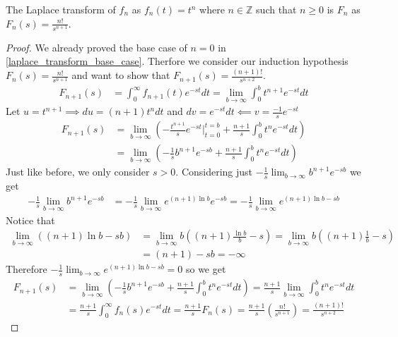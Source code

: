 \documentclass[notes]{subfiles}
\begin{document}
\begin{lemma}
    The Laplace transform of $f_n$ as $f_n(t) = t^n$ where $n \in \mathbb{Z}$ such that $n \geq 0$ is $F_n$ as $F_n(s) = \frac{n!}{s^{n + 1}}$.
\end{lemma}
\begin{proof}
    We already proved the base case of $n = 0$ in \cref{laplace_transform_base_case}. Therfore we consider our induction hypothesis $F_n(s) = \frac{n!}{s^{n + 1}}$   and want to show that $F_{n + 1}(s) = \frac{(n + 1)!}{s^{n + 2}}$.
    \begin{align*}
        F_{n + 1}(s)
        &= \int_0^\infty f_{n + 1}(t)e^{-st}dt
        = \lim_{b\to\infty} \int_0^b t^{n + 1}e^{-st}dt
    \end{align*}
    Let $u = t^{n + 1} \implies du = (n + 1)t^ndt$ and $dv = e^{-st}dt \impliedby v = \frac{-1}{s}e^{-st}$
    \begin{align*}
        F_{n + 1}(s)
        &= \lim_{b\to\infty} \left( -\frac{t^{n + 1}}{s}e^{-st}\Big|_{t = 0}^{t = b} + \frac{n + 1}{s}\int_0^b t^n e^{-st}dt \right) \\
        &= \lim_{b\to\infty} \left( -\frac{1}{s}b^{n + 1}e^{-sb} + \frac{n + 1}{s}\int_0^b t^n e^{-st}dt \right)
    \end{align*}
    Just like before, we only consider $s > 0$. Considering just $-\frac{1}{s}\lim_{b\to\infty} b^{n + 1}e^{-sb}$ we get
    \begin{align*}
        -\frac{1}{s}\lim_{b\to\infty} b^{n + 1}e^{-sb}
        &= -\frac{1}{s}\lim_{b\to\infty} e^{(n + 1)\ln b}e^{-sb}
        = -\frac{1}{s}\lim_{b\to\infty} e^{(n + 1)\ln b - sb}
    \end{align*}
    Notice that
    \begin{align*}
        \lim_{b\to\infty} ((n + 1)\ln b - sb)
        &= \lim_{b\to\infty} b\left((n + 1)\frac{\ln b}{b} - s\right)
        = \lim_{b\to\infty} b\left((n + 1)\frac{1}{b} - s\right) \\
        &= (n + 1) - sb
        = -\infty
    \end{align*}
    Therefore $-\frac{1}{s}\lim_{b\to\infty} e^{(n + 1)\ln b - sb} = 0$ so we get
    \begin{align*}
        F_{n + 1}(s)
        &= \lim_{b\to\infty} \left( -\frac{1}{s}b^{n + 1}e^{-sb} + \frac{n + 1}{s}\int_0^b t^n e^{-st}dt \right)
        = \frac{n + 1}{s}\lim_{b\to\infty} \int_0^b t^n e^{-st}dt \\
        &= \frac{n + 1}{s} \int_0^\infty f_n(s) e^{-st}dt
        = \frac{n + 1}{s} F_n(s)
        = \frac{n + 1}{s} \left( \frac{n!}{s^{n + 1}} \right)
        = \frac{(n + 1)!}{s^{n + 2}}
    \end{align*}
\end{proof}
\end{document}
